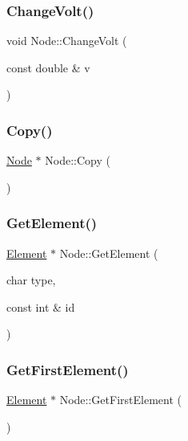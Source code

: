 \mbox{\label{class_node_a1d54adb1267a218ab049f39175cb2733}} 
\subsubsection{\texorpdfstring{Change\+Volt()}{ChangeVolt()}}
{\footnotesize\ttfamily void Node\+::\+Change\+Volt (\begin{DoxyParamCaption}\item[{const double \&}]{v }\end{DoxyParamCaption})}

\mbox{\label{class_node_a84931f4fbe5461c5f1553ae37260dd24}} 
\subsubsection{\texorpdfstring{Copy()}{Copy()}}
{\footnotesize\ttfamily \hyperlink{class_node}{Node} $\ast$ Node\+::\+Copy (\begin{DoxyParamCaption}{ }\end{DoxyParamCaption})}

\mbox{\label{class_node_aeaa68f0080c52716f6d0df146c8f7cf8}} 
\subsubsection{\texorpdfstring{Get\+Element()}{GetElement()}}
{\footnotesize\ttfamily \hyperlink{class_element}{Element} $\ast$ Node\+::\+Get\+Element (\begin{DoxyParamCaption}\item[{char}]{type,  }\item[{const int \&}]{id }\end{DoxyParamCaption})}

\mbox{\label{class_node_a29da8868ea4053aede270ed96b7425a0}} 
\subsubsection{\texorpdfstring{Get\+First\+Element()}{GetFirstElement()}}
{\footnotesize\ttfamily \hyperlink{class_element}{Element} $\ast$ Node\+::\+Get\+First\+Element (\begin{DoxyParamCaption}{ }\end{DoxyParamCaption})}


